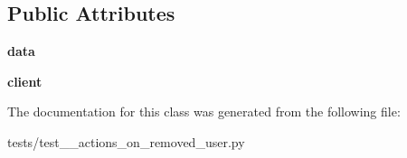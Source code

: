 \subsection*{Public Attributes}
\begin{DoxyCompactItemize}
\item 
\mbox{\label{classtests_1_1test__12__actions__on__removed__user_1_1_test_user_routes_a1923dc04f760148a4c20147eae6cf555}} 
{\bfseries data}
\item 
\mbox{\label{classtests_1_1test__12__actions__on__removed__user_1_1_test_user_routes_adb009bde78c8d63d634db97e5e112797}} 
{\bfseries client}
\end{DoxyCompactItemize}


The documentation for this class was generated from the following file\+:\begin{DoxyCompactItemize}
\item 
tests/test\+\_\+\_\+actions\+\_\+on\+\_\+removed\+\_\+user.\+py\end{DoxyCompactItemize}
